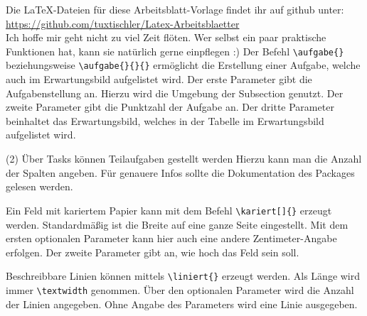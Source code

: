 \documentclass[a4paper, 12pt]{article}
\begin{document}
\large
\TITEL

Die \LaTeX -Dateien für diese Arbeitsblatt-Vorlage findet ihr auf github unter:\\
\url{https://github.com/tuxtischler/Latex-Arbeitsblaetter}\\
Ich hoffe mir geht nicht zu viel Zeit flöten. Wer selbst ein paar praktische Funktionen hat, kann sie natürlich gerne einpflegen :)
Der Befehl \texttt{\textbackslash aufgabe\{\}} beziehungsweise \texttt{\textbackslash aufgabe\{\}\{\}\{\}} ermöglicht die Erstellung einer Aufgabe, welche auch im Erwartungsbild aufgelistet wird. Der erste Parameter gibt die Aufgabenstellung an. Hierzu wird die Umgebung der Subsection genutzt. Der zweite Parameter gibt die Punktzahl der Aufgabe an. Der dritte Parameter beinhaltet das Erwartungsbild, welches in der Tabelle im Erwartungsbild aufgelistet wird.

\begin{tasks}(2)
	\task Über Tasks können Teilaufgaben gestellt werden
	\task Hierzu kann man die Anzahl der Spalten angeben. Für genauere Infos sollte die Dokumentation des Packages gelesen werden.	
\end{tasks}

Ein Feld mit kariertem Papier kann mit dem Befehl \texttt{\textbackslash kariert[]\{\}} erzeugt werden. Standardmäßig ist die Breite auf eine ganze Seite eingestellt. Mit dem ersten optionalen Parameter kann hier auch eine andere Zentimeter-Angabe erfolgen. Der zweite Parameter gibt an, wie hoch das Feld sein soll.

\newpage
{}

Beschreibbare Linien können mittels \texttt{\textbackslash liniert\{\}} erzeugt werden. Als Länge wird immer \texttt{\textbackslash textwidth} genommen. Über den optionalen Parameter wird die Anzahl der Linien angegeben. Ohne Angabe des Parameters wird eine Linie ausgegeben.


\end{document}
